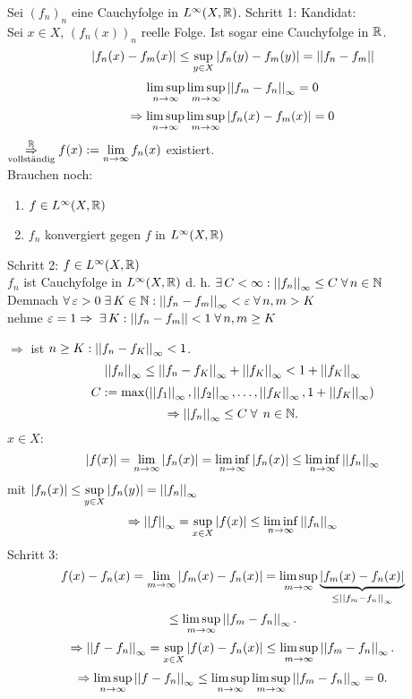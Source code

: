\documentclass[../ana2.tex]{subfiles}
\begin{document}
\begin{bew}
    Sei \( (f_n)_n \) eine Cauchyfolge in 
    \( L^\infty(X, \mathbb{R}) \).
    Schritt 1: Kandidat: \\
    Sei \( x \in X \), \( (f_n(x))_n \) reelle Folge.
    Ist sogar eine Cauchyfolge in \(\mathbb{R}\).
    \[ \left|f_n(x) - f_m(x)\right| \leq \underset{y \in X}{\sup} 
    \left|f_n(y)-f_m(y)\right| = \left|\left|f_n-f_m\right|\right| \]
    \[ \limsup\limits_{n\rightarrow\infty} \limsup\limits_{m\rightarrow\infty} \left|\left|f_m - f_n\right|\right|_\infty 
    = 0 \]
    \[ \Rightarrow \limsup\limits_{n\rightarrow\infty} \limsup\limits_{m\rightarrow\infty} 
    \left|f_n(x)-f_m(x)\right| = 0 \]
    \( \overset{\mathbb{R}}{\underset{\text{vollständig}}{\Rightarrow}} 
    f(x) := \lim\limits_{n\rightarrow\infty} f_n(x)\) existiert. \\
    Brauchen noch: 
    \begin{enumerate}
        \item \( f \in L^\infty(X, \mathbb{R}) \)
        \item \(f_n\) konvergiert gegen \(f\) in 
        \( L^\infty(X, \mathbb{R}) \)
    \end{enumerate}
    Schritt 2: \(f \in L^\infty(X, \mathbb{R})\) \\
    \( f_n \) ist Cauchyfolge in \(L^\infty(X,\mathbb{R})\)
    d. h. \( \exists C < \infty: \norm{f_n}_\infty 
    \leq C \; \forall n \in \N \) \\
    Demnach \( \forall \varepsilon > 0 \; \exists K \in \N: 
    \norm{f_n-f_m}_\infty < \varepsilon \; \forall n,m > K \) \\
    nehme \( \varepsilon = 1 \Rightarrow \; \exists K: \norm{f_n-f_m} 
    < 1 \; \forall n,m \geq K \)

    \( \Rightarrow \) ist \( n \geq K: 
    \left|\left|f_n - f_K\right|\right|_\infty < 1 \).
    \[ \left|\left|f_n\right|\right|_\infty \leq 
    \left|\left| f_n - f_K \right|\right|_\infty 
    + \left|\left|f_K\right|\right|_\infty < 1 + \left|\left|f_K\right|\right|_\infty \]
    \[ C := \max( \left|\left|f_1\right|\right|_\infty, 
    \left|\left|f_2\right|\right|_\infty, \ldots, 
    \left|\left|f_K\right|\right|_\infty, 1 + \left|\left|f_K\right|\right|_\infty ) \]
    \[ \Rightarrow \norm{f_n}_\infty \leq C \;\forall \; 
    n\in\N. \]
    \(x \in X\):
    \[ \left|f(x)\right| = \lim\limits_{n\rightarrow\infty} \left|f_n(x)\right| 
    = \liminf\limits_{n\rightarrow\infty} \left|f_n(x)\right|
    \leq \liminf\limits_{n\rightarrow\infty} \left|\left|f_n\right|\right|_\infty \]
    mit \( \left|f_n(x)\right| 
    \leq \underset{y \in X}{\sup} \left|f_n(y)\right| 
    = \left|\left|f_n\right|\right|_\infty \)
    \[ \Rightarrow \left|\left|f\right|\right|_\infty 
    = \underset{x \in X}{\sup} \left|f(x)\right|
    \leq \liminf\limits_{n\rightarrow\infty} \left|\left|f_n\right|\right|_\infty \]
    Schritt 3:
    \[ f(x) - f_n(x) = 
    \lim\limits_{m\rightarrow\infty} \left| f_m(x) - f_n(x) \right|
    = \limsup\limits_{m\rightarrow\infty} \underbrace{\left|f_m(x) - f_n(x)\right|}
    _{\leq \left|\left|f_m - f_n\right|\right|_\infty} \]
    \[ \leq \limsup\limits_{m\rightarrow\infty} \left|\left|f_m - f_n\right|\right|_\infty. \]
    \[ \Rightarrow \left|\left|f - f_n\right|\right|_\infty 
    = \underset{x \in X}{\sup} \left|f(x) - f_n(x)\right| 
    \leq \limsup\limits_{m\rightarrow\infty} \left|\left|f_m - f_n\right|\right|_\infty. \]
    \[ \Rightarrow \limsup\limits_{n\rightarrow\infty} \left|\left|f-f_n\right|\right|_\infty 
    \leq \limsup\limits_{n\rightarrow\infty}\limsup\limits_{m\rightarrow\infty} 
    \left|\left|f_m - f_n\right|\right|_\infty = 0. \]
\end{bew}
\end{document}
